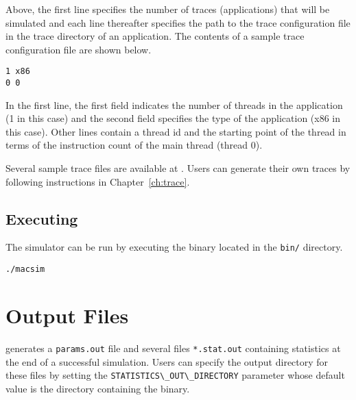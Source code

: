 \noindent 	Above, the first line specifies the number of traces (applications) that will
be simulated and each line thereafter specifies the path to the trace
configuration file in the trace directory of an application. The contents of a
sample trace configuration file are shown below.

\begin{Verbatim}
1 x86
0 0
\end{Verbatim}

\noindent In the first line, the first field indicates the number of threads in
the application (1 in this case) and the second field specifies the type of the
application (x86 in this case). Other lines contain a thread id and the starting 
point of the thread in terms of the instruction count of the main thread
(thread 0).


Several sample trace files are available at
. Users can generate their own
traces by following instructions in Chapter~\ref{ch:trace}.


\subsection*{Executing}

The \SIM simulator can be run by executing the \bin binary located in the
\Verb+bin/+ directory.

\begin{Verbatim}
./macsim
\end{Verbatim}



\section{Output Files}

\SIM generates a \Verb+params.out+ file and several files \Verb+*.stat.out+
containing statistics at the end of a successful simulation. Users can specify
the output directory for these files by setting the
\Verb+STATISTICS\_OUT\_DIRECTORY+ parameter whose default value is the
directory containing the \bin binary.


